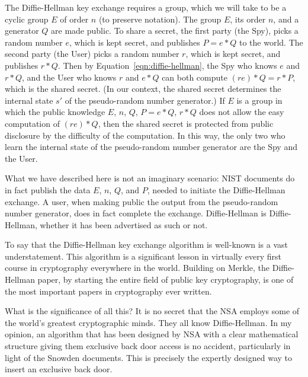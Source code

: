 \documentclass[11pt]{amsart} %
\begin{document}
The Diffie-Hellman key exchange requires a group, which  we will take to
be a cyclic group $E$ of order $n$ (to preserve notation).  
The group $E$, its order $n$, and a generator $Q$
are made public.    To share a secret, 
the first party  (the Spy), picks a random number $e$, which is kept
secret, and publishes $P = e * Q$ to the world.  
The second party (the User) picks a random number
$r$, which is kept secret, and publishes $r * Q$.   Then
by Equation~\ref{eqn:diffie-hellman}, 
the Spy who knows $e$ and $r *Q$, 
and the User who knows $r$ and $e * Q$ can both compute
$(r e) * Q = r * P$, which is the shared secret.
(In our context, the shared secret determines the internal state $s'$ of the pseudo-random number generator.)
If $E$ is a group in which the public knowledge $E$, $n$, $Q$, $P = e * Q$, $r * Q$ does not
allow the easy computation of $(r e) * Q$, then the shared secret is protected from public disclosure 
by the difficulty of the computation.  
In this way, the only two who learn the internal state
of the pseudo-random number generator are the Spy and the User.

What we have described here is not an imaginary scenario: NIST documents do in fact publish the
data $E$, $n$, $Q$, and $P$, needed to initiate the Diffie-Hellman exchange.
A user, when making public the output from the pseudo-random number generator, does in fact complete the
exchange.  Diffie-Hellman is Diffie-Hellman, whether it has been advertised as such or not.

To say that the Diffie-Hellman key exchange algorithm is well-known is a vast understatement.
This algorithm is a significant lesson in  virtually every first course in cryptography
 everywhere
in the world.
Building on Merkle, the Diffie-Hellman paper, by starting the entire field of public key cryptography,
is one of the most important papers in cryptography ever written.

What is the significance of all this?     It is no secret that the NSA employs some of the world's greatest cryptographic minds.  
They all know Diffie-Hellman. 
In my opinion, an algorithm that
has been designed by NSA with a clear mathematical structure giving them exclusive back door access is
no accident, particularly in light of the Snowden documents.  
This is precisely the expertly designed way to insert an exclusive back door.

\end{document}
